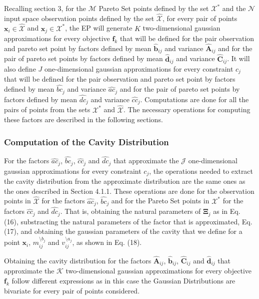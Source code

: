 \documentclass[review,preprint,12pt]{elsarticle}
\begin{document}
Recalling section 3, for the $\mathcal{M}$ Pareto Set points defined by the set $\mathcal{X}^*$ and the $\mathcal{N}$ input space observation points defined by the set $\hat{\mathcal{X}}$, for every pair of points $\boldsymbol{x}_i \in \hat{\mathcal{X}}$ and $\boldsymbol{x}_j \in \mathcal{X}^*$, the EP will generate $K$ two-dimensional gaussian approximations for every objective $\boldsymbol{f}_k$ that will be defined for the pair observation and pareto set point by factors defined by mean $\hat{\boldsymbol{b}}_{ij}$ and variance $\hat{\boldsymbol{A}}_{ij}$ and for the pair of pareto set points by factors defined by mean $\hat{\boldsymbol{d}}_{ij}$ and variance $\hat{\boldsymbol{C}}_{ij}$. It will also define $J$ one-dimensional gaussian approximations for every constraint $c_j$ that will be defined for the pair observation and pareto set point by factors defined by mean $\hat{bc}_j$ and variance $\hat{ac}_j$ and for the pair of pareto set points by factors defined by mean $\hat{dc}_j$ and variance $\hat{cc}_j$. Computations are done for all the pairs of points from the sets $\mathcal{X}^*$ and $\hat{\mathcal{X}}$. The necessary operations for computing these factors are described in the following sections.

\subsubsection{Computation of the Cavity Distribution}
For the factors $\hat{ac}_j$, $\hat{bc}_j$, $\hat{cc}_j$ and $\hat{dc}_j$ that approximate the $\mathcal{J}$ one-dimensional gaussian approximations for every constraint $c_j$, the operations needed to extract the cavity distribution from the approximate distribution are the same ones as the ones described in Section 4.1.1. These operations are done for the observation points in $\hat{\mathcal{X}}$ for the factors $\hat{ac}_j$, $\hat{bc}_j$ and for the Pareto Set points in $\mathcal{X}^*$ for the factors $\hat{cc}_j$ and $\hat{dc}_j$. That is, obtaining the natural parameters of $\boldsymbol{\Xi}_j$ as in Eq. (16), substracting the natural parameters of the factor that is approximated, Eq. (17), and obtaining the gaussian parameters of the cavity that we define for a point $\boldsymbol{x}_i$, $m_{ij}^{\setminus b_j}$ and $v_{ij}^{\setminus a_j}$, as shown in Eq. (18).

Obtaining the cavity distribution for the factors $\hat{\boldsymbol{A}}_{ij}$, $\hat{\boldsymbol{b}}_{ij}$, $\hat{\boldsymbol{C}}_{ij}$ and $\hat{\boldsymbol{d}}_{ij}$ that approximate the $\mathcal{K}$ two-dimensional gaussian approximations for every objective $\boldsymbol{f}_k$ follow different expressions as in this case the Gaussian Distributions are bivariate for every pair of points considered.
\end{document}
